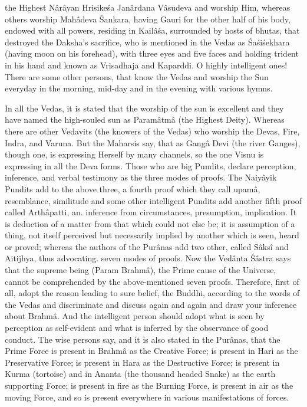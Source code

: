 the Highest N\^ar\^ayan Hrisike\'sa Jan\^ardana V\^asudeva and worship Him, whereas others worship Mah\^adeva \'Sankara, having Gauri for the other half of his body, endowed with all powers, residing in Kail\^a\'sa, surrounded by hosts of bhutas, that destroyed the Daksha's sacrifice, who is mentioned in the Vedas as \'Sa\'si\'sekhara (having moon on his forehead), with three eyes and five faces and holding trident in his hand and known as Vrisadhaja and Kaparddi. O highly intelligent ones! There are some other persons, that know the Vedas and worship the Sun everyday in the morning, mid-day and in the evening with various hymns.

In all the Vedas, it is stated that the worship of the sun is excellent and they have named the high-souled sun as Param\^atm\^a (the Highest Deity). Whereas there are other Vedavits (the knowers of the Vedas) who worship the Devas, Fire, Indra, and Varuna. But the Maharsis say, that as Gang\^a Devi (the river Ganges), though one, is expressing Herself by many channels, so the one Visnu is expressing in all the Deva forms. Those who are big Pundits, declare perception, inference, and verbal testimony as the three modes of proofs. The Naiy\^ayik Pundits add to the above three, a fourth proof which they call upam\^a, resemblance, similitude and some other intelligent Pundits add another fifth proof called Arth\^apatti, an. inference from circumstances, presumption, implication. It is deduction of a matter from that which could not else be; it is assumption of a thing, not itself perceived but necessarily implied by another which is seen, heard or proved; whereas the authors of the Pur\^anas add two other, called S\^aks\^i and Aitijhya, thus advocating. seven modes of proofs. Now the Ved\^anta \'S\^astra says that the supreme being (Param Brahm\^a), the Prime cause of the Universe, cannot be comprehended by the above-mentioned seven proofs. Therefore, first of all, adopt the reason leading to sure belief, the Buddhi, according to the words of the Vedas and discriminate and discuss again and again and draw your inference about Brahm\^a. And the intelligent person should adopt what is seen by perception as self-evident and what is inferred by the observance of good conduct. The wise persons say, and it is also stated in the Pur\^anas, that the Prime Force is present in Brahm\^a as the Creative Force; is present in Hari as the Preservative Force; is present in Hara as the Destructive Force; is present in Kurma (tortoise) and in Ananta (the thousand headed Snake) as the earth supporting Force; is present in fire as the Burning Force, is present in air as the moving Force, and so is present everywhere in various manifestations of forces.

